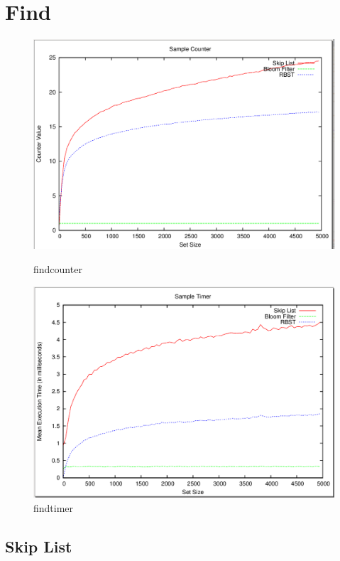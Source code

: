\documentclass[11pt]{article}
\begin{document}
\section*{Find}
\begin{figure}[H]
\begin{minipage}{.5\linewidth}
\centering
\includegraphics[width=1\linewidth]{findcounter.png}
\caption{findcounter}
\end{minipage}
\hspace{0.5cm}
\begin{minipage}{.5\linewidth}
\centering
\includegraphics[width=1\linewidth]{findtimer.png}
\caption{findtimer}
\end{minipage}
\end{figure}
\subsection*{Skip List}
\end{document}

